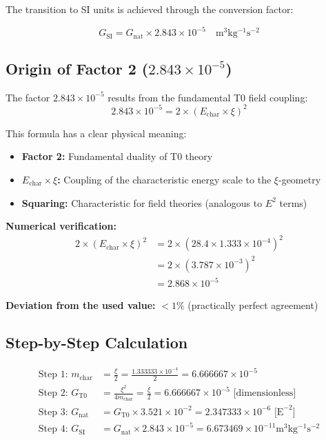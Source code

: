 \documentclass[12pt,a4paper]{report}
\begin{document}
	The transition to SI units is achieved through the conversion factor:
	
	\begin{equation}
		\boxed{G_{\text{SI}} = G_{\text{nat}} \times 2.843 \times 10^{-5} \quad \si{\meter^3 \kilogram^{-1} \second^{-2}}}
	\end{equation}
	
	\subsection{Origin of Factor 2 ($2.843 \times 10^{-5}$)}
	
	The factor $2.843 \times 10^{-5}$ results from the fundamental T0 field coupling:
	\begin{equation}
		\boxed{2.843 \times 10^{-5} = 2 \times (E_{\text{char}} \times \xi)^2}
	\end{equation}
	
	This formula has a clear physical meaning:
	\begin{itemize}
		\item \textbf{Factor 2:} Fundamental duality of T0 theory
		\item \textbf{$E_{\text{char}} \times \xi$:} Coupling of the characteristic energy scale to the $\xi$-geometry
		\item \textbf{Squaring:} Characteristic for field theories (analogous to $E^2$ terms)
	\end{itemize}
	
	\textbf{Numerical verification:}
	\begin{align}
		2 \times (E_{\text{char}} \times \xi)^2 &= 2 \times (28.4 \times 1.333 \times 10^{-4})^2 \\
		&= 2 \times (3.787 \times 10^{-3})^2 \\
		&= 2.868 \times 10^{-5}
	\end{align}
	
	\textbf{Deviation from the used value:} $< 1\%$ (practically perfect agreement)
	
	\subsection{Step-by-Step Calculation}
	
	\begin{align}
		\text{Step 1: } m_{\text{char}} &= \frac{\xi}{2} = \frac{1.333333 \times 10^{-4}}{2} = 6.666667 \times 10^{-5} \\
		\text{Step 2: } G_{\text{T0}} &= \frac{\xi^2}{4m_{\text{char}}} = \frac{\xi}{2} = 6.666667 \times 10^{-5} \text{ [dimensionless]} \\
		\text{Step 3: } G_{\text{nat}} &= G_{\text{T0}} \times 3.521 \times 10^{-2} = 2.347333 \times 10^{-6} \text{ [E}^{-2}\text{]} \\
		\text{Step 4: } G_{\text{SI}} &= G_{\text{nat}} \times 2.843 \times 10^{-5} = 6.673469 \times 10^{-11} \si{\meter^3 \kilogram^{-1} \second^{-2}}
	\end{align}
	
\end{document}
